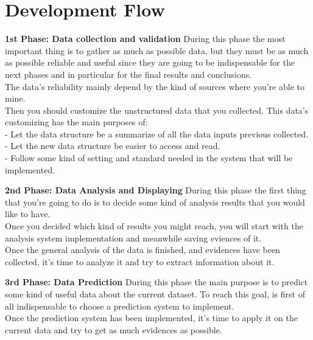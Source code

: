 
\hypersetup{
    colorlinks=true,
    linkcolor=blue,
    filecolor=magenta,      
    urlcolor=blue,
}


\section{Development Flow}

\textbf{1st Phase: Data collection and validation}
During this phase the most important thing is to gather as much as possible data, but they must be as much as possible reliable and useful since they are going to be indispensable for the next phases and in particular for the final results and conclusions.\\
The data’s reliability mainly depend by the kind of sources where you’re able to mine.\\
Then you should customize the unstructured data that you collected. This data’s customizing has the main purposes of:\\
- Let the data structure be a summarize of all the data inputs previous collected.\\
- Let the new data structure be easier to access and read.\\
- Follow some kind of setting and standard needed in the system that will be implemented.

\textbf{2nd Phase: Data Analysis and Displaying}
During this phase the first thing that you’re going to do is to decide some kind of analysis results that you would like to have.\\
Once you decided which kind of results you might reach, you will start with the analysis system implementation and meanwhile saving eviences of it.\\
Once the general analysis of the data is finished, and evidences have been collected, it's time to analyze it and try to extract information about it.

\newpage

\textbf{3rd Phase: Data Prediction}
During this phase the main purpose is to predict some kind of useful data about the current dataset. To reach this goal, is first of all indispensable to choose a prediction system to implement. \\
Once the prediction system has been implemented, it's time to apply it on the current data and try to get as much evidences as possible. \\

